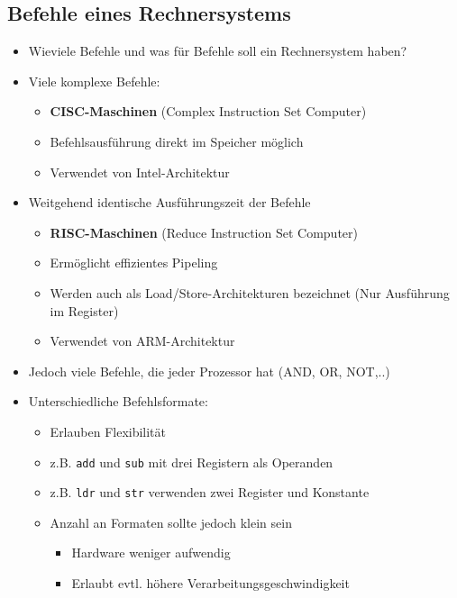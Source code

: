 \subsection{Befehle eines Rechnersystems}
    \begin{itemize}
        \item Wieviele Befehle und was für Befehle soll ein Rechnersystem haben?
        \item Viele komplexe Befehle: 
            \begin{itemize}
                \item \textbf{CISC-Maschinen} (Complex Instruction Set Computer)
                \item Befehlsausführung direkt im Speicher möglich
                \item Verwendet von Intel-Architektur 
            \end{itemize}
        \item Weitgehend identische Ausführungszeit der Befehle
            \begin{itemize}
                \item \textbf{RISC-Maschinen} (Reduce Instruction Set Computer)
                \item Ermöglicht effizientes Pipeling
                \item Werden auch als Load/Store-Architekturen bezeichnet (Nur Ausführung im Register)
                \item Verwendet von ARM-Architektur
            \end{itemize}
        \item Jedoch viele Befehle, die jeder Prozessor hat (AND, OR, NOT,..)
        \item Unterschiedliche Befehlsformate:
            \begin{itemize}
                \item Erlauben Flexibilität
                \item z.B. \texttt{add} und \texttt{sub} mit drei Registern als Operanden
                \item z.B. \texttt{ldr} und \texttt{str} verwenden zwei Register und Konstante
                \item Anzahl an Formaten sollte jedoch klein sein 
                    \begin{itemize}
                        \item Hardware weniger aufwendig
                        \item Erlaubt evtl. höhere Verarbeitungsgeschwindigkeit

\end{itemize}
\end{itemize}
\end{itemize}
